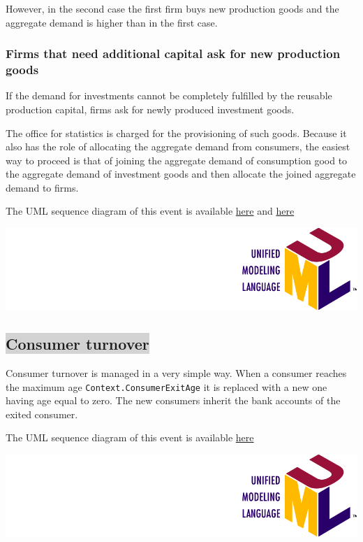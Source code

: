 \documentclass{book}
\newcommand{\doclocation}{file:///Users/giulioni/Documents/workspace/gabriele/docs}
\begin{document}
However, in the second case the first firm buys new production goods and the aggregate demand is higher than in the first case. 

\subsubsection{Firms that need additional capital ask for new production goods}

If the demand for investments cannot be completely fulfilled by the reusable production capital, firms ask for newly produced investment goods. 

The office for statistics is charged for the  provisioning of such goods. Because it also has the role of allocating the aggregate demand from consumers, the easiest way to proceed is that of joining the aggregate demand of consumption good to the aggregate demand of investment goods and then allocate the joined aggregate demand to firms.

\vskip3mm
The UML sequence diagram of this event is available \href{\doclocation/umldoc/computeInvestments.html}{here} and \href{\doclocation/umldoc/allocateInvestments.html}{here}
\begin{marginfigure}
	\includegraphics[scale=0.1]{uml.png}
\end{marginfigure}





\subsection*{\colorbox{lightgray}{Consumer turnover}}

Consumer turnover is managed in a very simple way. When a consumer reaches the maximum age \verb+Context.ConsumerExitAge+ it is replaced with a new one having age equal to zero. The new consumers inherit the bank accounts of the exited consumer.

\vskip3mm
The UML sequence diagram of this event is available \href{\doclocation/umldoc/performConsumersTurnover.html}{here}
\begin{marginfigure}
	\includegraphics[scale=0.1]{uml.png}
\end{marginfigure}
\vskip3mm
\end{document}
